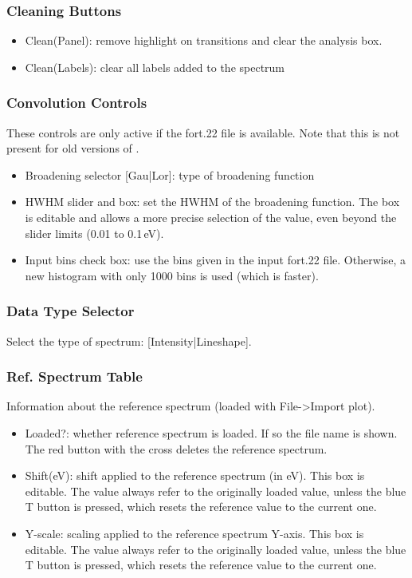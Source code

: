 \documentclass[a4paper,11pt]{article}
\begin{document}
\subsubsection{Cleaning Buttons}
\begin{itemize}
 \item Clean(Panel): remove highlight on transitions and clear the analysis box.
 \item Clean(Labels): clear all labels added to the spectrum
\end{itemize}

\subsubsection{Convolution Controls}
These controls are only active if the fort.22 file is available. Note that this is not present for old versions of \fcc.
\begin{itemize}
 \item Broadening selector [Gau|Lor]: type of broadening function
 \item HWHM slider and box: set the HWHM of the broadening function. The box is editable and allows a more precise selection of the value, even beyond the slider limits (0.01 to 0.1\,eV).
 \item Input bins check box: use the bins given in the input fort.22 file. Otherwise, a new histogram with only 1000 bins is used (which is faster).
\end{itemize}

\subsubsection{Data Type Selector}
Select the type of spectrum: [Intensity|Lineshape].

\subsubsection{Ref. Spectrum Table}
Information about the reference spectrum (loaded with File->Import plot).

\begin{itemize}
 \item Loaded?: whether reference spectrum is loaded. If so the file name is shown. The red button with the cross deletes the reference spectrum.
 \item Shift(eV): shift applied to the reference spectrum (in eV). This box is editable. The value always refer to the originally loaded value, unless the blue T button is pressed, which resets the reference value to the current one.
 \item Y-scale: scaling applied to the reference spectrum Y-axis. This box is editable. The value always refer to the originally loaded value, unless the blue T button is pressed, which resets the reference value to the current one.
\end{itemize}
\end{document}
